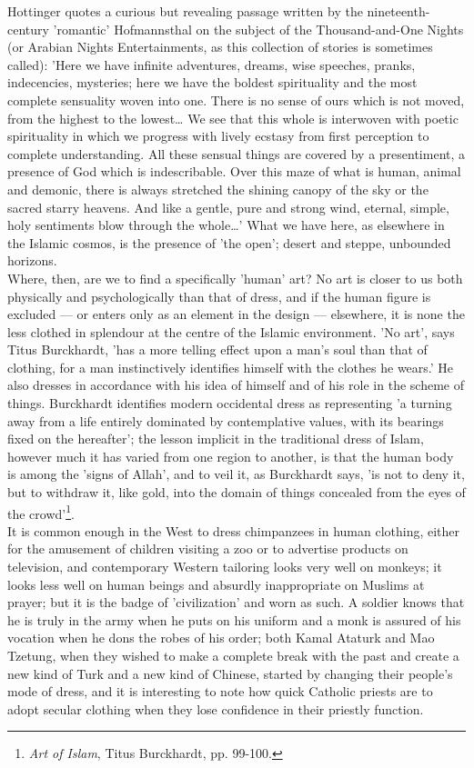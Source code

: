 \documentclass[11pt, b5paper, twoside]{book}
\begin{document}
Hottinger quotes a curious but revealing passage written by the nineteenth-century 'romantic' 
Hofmannsthal on the subject of the Thousand-and-One Nights (or Arabian Nights Entertainments, as this 
collection of stories is sometimes called): 'Here we have infinite adventures, dreams, wise speeches, 
pranks, indecencies, mysteries; here we have the boldest spirituality and the most complete 
sensuality woven into one. There is no sense of ours which is not moved, from the highest to the 
lowest\ldots{} We see that this whole is interwoven with poetic spirituality in which we progress with 
lively ecstasy from first perception to complete understanding. All these sensual things are covered 
by a presentiment, a presence of God which is indescribable. Over this maze of what is human, animal 
and demonic, there is always stretched the shining canopy of the sky or the sacred starry heavens. 
And like a gentle, pure and strong wind, eternal, simple, holy sentiments blow through the whole\ldots{}' 
What we have here, as elsewhere in the Islamic cosmos, is the presence of 'the open'; desert and 
steppe, unbounded horizons. \\

Where, then, are we to find a specifically 'human' art? No art is closer to us both physically and 
psychologically than that of dress, and if the human figure is excluded --- or enters only as an 
element in the design --- elsewhere, it is none the less clothed in splendour at the centre of the 
Islamic environment. 'No art', says Titus Burckhardt, 'has a more telling effect upon a man's soul 
than that of clothing, for a man instinctively identifies himself with the clothes he wears.' He also 
dresses in accordance with his idea of himself and of his role in the scheme of things. Burckhardt 
identifies modern occidental dress as representing 'a turning away from a life entirely dominated by 
contemplative values, with its bearings fixed on the hereafter'; the lesson implicit in the 
traditional dress of Islam, however much it has varied from one region to another, is that the human 
body is among the 'signs of Allah', and to veil it, as Burckhardt says, 'is not to deny it, but to 
withdraw it, like gold, into the domain of things concealed from the eyes of the crowd'\footnote{\emph{Art of Islam}, Titus Burckhardt, pp. 99-100.}. \\

It is common enough in the West to dress chimpanzees in human clothing, either for the amusement of 
children visiting a zoo or to advertise products on television, and contemporary Western tailoring 
looks very well on monkeys; it looks less well on human beings and absurdly inappropriate on Muslims 
at prayer; but it is the badge of 'civilization' and worn as such. A soldier knows that he is truly 
in the army when he puts on his uniform and a monk is assured of his vocation when he dons the robes 
of his order; both Kamal Ataturk and Mao Tzetung, when they wished to make a complete break with the 
past and create a new kind of Turk and a new kind of Chinese, started by changing their people's mode 
of dress, and it is interesting to note how quick Catholic priests are to adopt secular clothing when 
they lose confidence in their priestly function. \\
\end{document}
